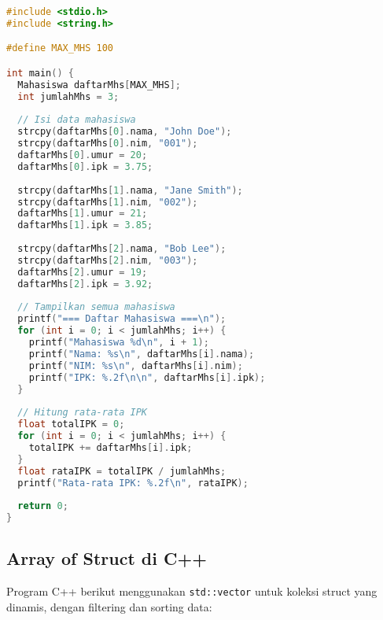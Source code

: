 \documentclass[../main.tex]{subfiles}
\begin{document}
\begin{lstlisting}[language=C, caption={Array of struct di C}]
#include <stdio.h>
#include <string.h>

#define MAX_MHS 100

int main() {
  Mahasiswa daftarMhs[MAX_MHS];
  int jumlahMhs = 3;
  
  // Isi data mahasiswa
  strcpy(daftarMhs[0].nama, "John Doe");
  strcpy(daftarMhs[0].nim, "001");
  daftarMhs[0].umur = 20;
  daftarMhs[0].ipk = 3.75;
  
  strcpy(daftarMhs[1].nama, "Jane Smith");
  strcpy(daftarMhs[1].nim, "002");
  daftarMhs[1].umur = 21;
  daftarMhs[1].ipk = 3.85;
  
  strcpy(daftarMhs[2].nama, "Bob Lee");
  strcpy(daftarMhs[2].nim, "003");
  daftarMhs[2].umur = 19;
  daftarMhs[2].ipk = 3.92;
  
  // Tampilkan semua mahasiswa
  printf("=== Daftar Mahasiswa ===\n");
  for (int i = 0; i < jumlahMhs; i++) {
    printf("Mahasiswa %d\n", i + 1);
    printf("Nama: %s\n", daftarMhs[i].nama);
    printf("NIM: %s\n", daftarMhs[i].nim);
    printf("IPK: %.2f\n\n", daftarMhs[i].ipk);
  }
  
  // Hitung rata-rata IPK
  float totalIPK = 0;
  for (int i = 0; i < jumlahMhs; i++) {
    totalIPK += daftarMhs[i].ipk;
  }
  float rataIPK = totalIPK / jumlahMhs;
  printf("Rata-rata IPK: %.2f\n", rataIPK);
  
  return 0;
}
\end{lstlisting}

\subsection{Array of Struct di C++}

Program C++ berikut menggunakan \texttt{std::vector} untuk koleksi struct yang dinamis, dengan filtering dan sorting data:
\end{document}
